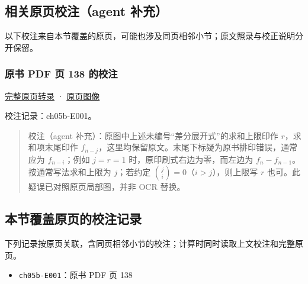 \documentclass[
  10pt,
  fontset=fandol]{ctexart}
\providecommand{\tightlist}{%
  \setlength{\itemsep}{0pt}\setlength{\parskip}{0pt}}
\begin{document}
\subsection{相关原页校注（agent 补充）}\label{ux76f8ux5173ux539fux9875ux6821ux6ce8agent-ux8865ux5145}

以下校注来自本节覆盖的原页，可能也涉及同页相邻小节；原文照录与校正说明分开保留。

\subsubsection{原书 PDF 页 138 的校注}\label{ux539fux4e66-pdf-ux9875-138-ux7684ux6821ux6ce8}

\href{../pages/pdf-138.md}{完整原页转录} · \href{../../source-images/pdf-138.jpeg}{原页图像}

校注记录：ch05b-E001。

\begin{quote}
校注（agent 补充）：原图中上述未编号``差分展开式''的求和上限印作 \(r\)，求和项末尾印作 \(f_{n-j}\)，这里均保留原文。末尾下标疑为原书排印错误，通常应为 \(f_{n-i}\)；例如 \(j=r=1\) 时，原印刷式右边为零，而左边为 \(f_n-f_{n-1}\)。按通常写法求和上限为 \(j\)；若约定 \(\binom ji=0\)（\(i>j\)），则上限写 \(r\) 也可。此疑误已对照原页局部图，并非 OCR 替换。
\end{quote}

\subsection{本节覆盖原页的校注记录}\label{ux672cux8282ux8986ux76d6ux539fux9875ux7684ux6821ux6ce8ux8bb0ux5f55}

下列记录按原页关联，含同页相邻小节的校注；计算时同时读取上文校注和完整原页。

\begin{itemize}
\tightlist
\item
  \texttt{ch05b-E001}：原书 PDF 页 138
\end{itemize}
\end{document}
